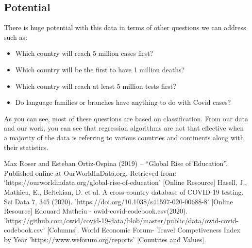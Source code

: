 \documentclass[conference]{IEEEtran}
\begin{document}
\subsection{Potential}

There is huge potential with this data in terms of other questions we can address such as:
\begin{itemize}
\item Which country will reach 5 million cases first?
\item Which country will be the first to have 1 million deaths?
\item Which country will reach at least 5 million tests first?
\item Do language families or branches have anything to do with Covid cases?
\end{itemize}
As you can see, most of these questions are based on classification. From our data and our work, you can see that regression algorithms are not that effective when a majority of the data is referring to various countries and continents along with their statistics.

\begin{thebibliography}{00}
 Max Roser and Esteban Ortiz-Ospina (2019) – “Global Rise of Education”. Published online at OurWorldInData.org. Retrieved from: ‘https://ourworldindata.org/global-rise-of-education’ [Online Resource]
 Hasell, J., Mathieu, E., Beltekian, D. et al. A cross-country database of COVID-19 testing. Sci Data 7, 345 (2020). 'https://doi.org/10.1038/s41597-020-00688-8' [Online Resource]
 Edouard Matheiu - owid-covid-codebook.csv(2020). 'https://github.com/owid/covid-19-data/blob/master/public/data/owid-covid-codebook.csv' [Columns].
 World Economic Forum- Travel Competiveness Index by Year 'https://www.weforum.org/reports' [Countries and Values].
\end{thebibliography}
\vspace{12pt}
\color{red}
\end{document}

